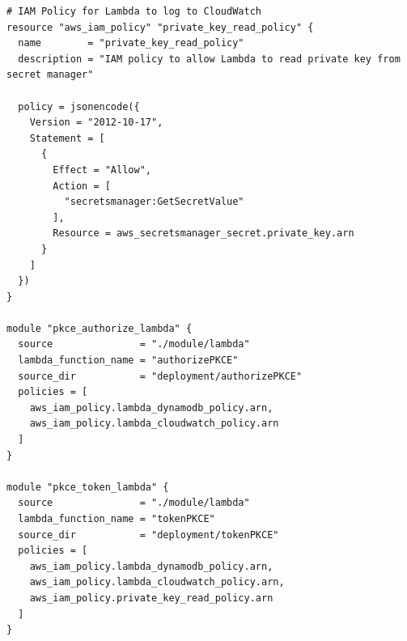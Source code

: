 \begin{lstlisting}[caption={Terraform For Least Privilidge}, label={apendix:least_privilidge}]
# IAM Policy for Lambda to log to CloudWatch
resource "aws_iam_policy" "private_key_read_policy" {
  name        = "private_key_read_policy"
  description = "IAM policy to allow Lambda to read private key from secret manager"

  policy = jsonencode({
    Version = "2012-10-17",
    Statement = [
      {
        Effect = "Allow",
        Action = [
          "secretsmanager:GetSecretValue"
        ],
        Resource = aws_secretsmanager_secret.private_key.arn
      }
    ]
  })
}

module "pkce_authorize_lambda" {
  source               = "./module/lambda"
  lambda_function_name = "authorizePKCE"
  source_dir           = "deployment/authorizePKCE"
  policies = [
    aws_iam_policy.lambda_dynamodb_policy.arn,
    aws_iam_policy.lambda_cloudwatch_policy.arn
  ]
}

module "pkce_token_lambda" {
  source               = "./module/lambda"
  lambda_function_name = "tokenPKCE"
  source_dir           = "deployment/tokenPKCE"
  policies = [
    aws_iam_policy.lambda_dynamodb_policy.arn,
    aws_iam_policy.lambda_cloudwatch_policy.arn,
    aws_iam_policy.private_key_read_policy.arn
  ]
}
\end{lstlisting}

